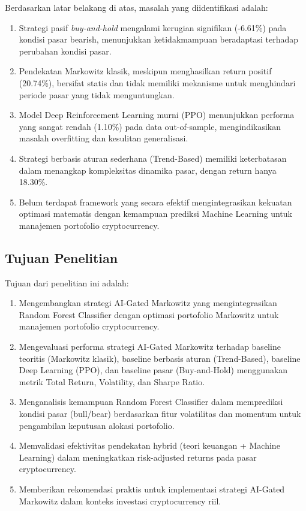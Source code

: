 \documentclass[12pt,a4paper]{article}
\begin{document}
Berdasarkan latar belakang di atas, masalah yang diidentifikasi adalah:

\begin{enumerate}
    \item Strategi pasif \textit{buy-and-hold} mengalami kerugian signifikan (-6.61\%) pada kondisi pasar bearish, menunjukkan ketidakmampuan beradaptasi terhadap perubahan kondisi pasar.
    
    \item Pendekatan Markowitz klasik, meskipun menghasilkan return positif (20.74\%), bersifat statis dan tidak memiliki mekanisme untuk menghindari periode pasar yang tidak menguntungkan.
    
    \item Model Deep Reinforcement Learning murni (PPO) menunjukkan performa yang sangat rendah (1.10\%) pada data out-of-sample, mengindikasikan masalah overfitting dan kesulitan generalisasi.
    
    \item Strategi berbasis aturan sederhana (Trend-Based) memiliki keterbatasan dalam menangkap kompleksitas dinamika pasar, dengan return hanya 18.30\%.
    
    \item Belum terdapat framework yang secara efektif mengintegrasikan kekuatan optimasi matematis dengan kemampuan prediksi Machine Learning untuk manajemen portofolio cryptocurrency.
\end{enumerate}

\subsection{Tujuan Penelitian}

Tujuan dari penelitian ini adalah:

\begin{enumerate}
    \item Mengembangkan strategi AI-Gated Markowitz yang mengintegrasikan Random Forest Classifier dengan optimasi portofolio Markowitz untuk manajemen portofolio cryptocurrency.
    
    \item Mengevaluasi performa strategi AI-Gated Markowitz terhadap baseline teoritis (Markowitz klasik), baseline berbasis aturan (Trend-Based), baseline Deep Learning (PPO), dan baseline pasar (Buy-and-Hold) menggunakan metrik Total Return, Volatility, dan Sharpe Ratio.
    
    \item Menganalisis kemampuan Random Forest Classifier dalam memprediksi kondisi pasar (bull/bear) berdasarkan fitur volatilitas dan momentum untuk pengambilan keputusan alokasi portofolio.
    
    \item Memvalidasi efektivitas pendekatan hybrid (teori keuangan + Machine Learning) dalam meningkatkan risk-adjusted returns pada pasar cryptocurrency.
    
    \item Memberikan rekomendasi praktis untuk implementasi strategi AI-Gated Markowitz dalam konteks investasi cryptocurrency riil.
\end{enumerate}
\end{document}

